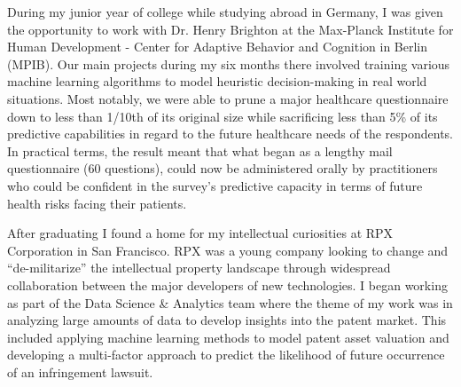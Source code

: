 
During my junior year of college while studying abroad in Germany, I was given the opportunity to work with Dr. Henry Brighton at the Max-Planck Institute for Human Development - Center for Adaptive Behavior and Cognition in Berlin (MPIB). Our main projects during my six months there involved training various machine learning algorithms to model heuristic decision-making in real world situations. Most notably, we were able to prune a major healthcare questionnaire down to less than 1/10th of its original size while sacrificing less than 5\% of its predictive capabilities in regard to the future healthcare needs of the respondents. In practical terms, the result meant that what began as a lengthy mail questionnaire (60 questions), could now be administered orally by practitioners who could be confident in the survey's predictive capacity in terms of future health risks facing their patients. 




After graduating I found a home for my intellectual curiosities at RPX Corporation in San Francisco. RPX was a young company looking to change and ``de-militarize'' the intellectual property landscape through widespread collaboration between the major developers of new technologies. I began working as part of the Data Science \& Analytics team where the theme of my work was in analyzing large amounts of data to develop insights into the patent market. This included applying machine learning methods to model patent asset valuation and developing a multi-factor approach to predict the likelihood of future occurrence of an infringement lawsuit.

